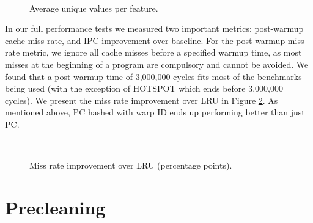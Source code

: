 \begin{figure}[htb]
\begin{center}
\ 
\caption{Average unique values per feature.}
\label{f:opt_uniq_vals}
\end{center}
\end{figure}

In our full performance tests we measured two important metrics: post-warmup cache miss rate, and IPC improvement over baseline. For the post-warmup miss rate metric, we ignore all cache misses before a specified warmup time, as most misses at the beginning of a program are compulsory and cannot be avoided. We found that a post-warmup time of 3,000,000 cycles fits most of the benchmarks being used (with the exception of HOTSPOT which ends before 3,000,000 cycles). We present the miss rate improvement over LRU in Figure \ref{f:hawkeye_pw_miss_rate}. As mentioned above, PC hashed with warp ID ends up performing better than just PC.


\begin{figure}[htb]
\begin{center}
\ 
\caption{Miss rate improvement over LRU (percentage points).}
\label{f:hawkeye_pw_miss_rate}
\end{center}
\end{figure}

\section{Precleaning}
